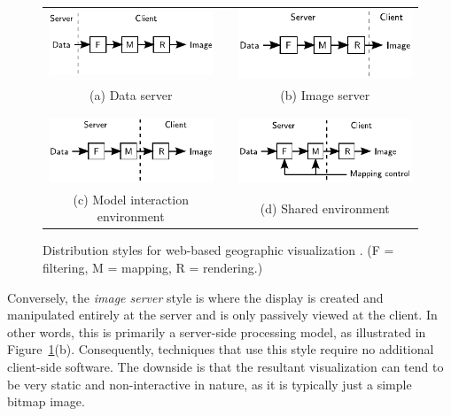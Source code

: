 \documentclass[acmnow]{acmtrans2m}
\begin{document}
\begin{figure}
	\centering
	\begin{tabular}{ccc}
		\includegraphics[scale=0.9]{data_server}	&
		\qquad	&
		\includegraphics[scale=0.9]{image_server}	\\
		\footnotesize (a) Data server	&
		\qquad	&
		\footnotesize (b) Image server	\\
		\\
		\\
		\includegraphics[scale=0.9]{model_interaction}	&
		\qquad	&
		\includegraphics[scale=0.9]{shared}	\\
		\footnotesize (c) Model interaction environment	&
		\qquad	&
		\footnotesize (d) Shared environment	\\
	\end{tabular}
	\caption{Distribution styles for web-based geographic visualization
	\protect\cite{Wood-J-1996-vis}. (F = filtering, M = mapping, R =
	rendering.)}
	\label{fig-distribution-styles}
\end{figure}


Conversely, the \emph{image server} style is where the display is
created and manipulated entirely at the server and is only passively
viewed at the client. In other words, this is primarily a server-side
processing model, as illustrated in
Figure~\ref{fig-distribution-styles}(b). Consequently, techniques that
use this style require no additional client-side software. The downside
is that the resultant visualization can tend to be very static and
non-interactive in nature, as it is typically just a simple bitmap
image.
\end{document}
